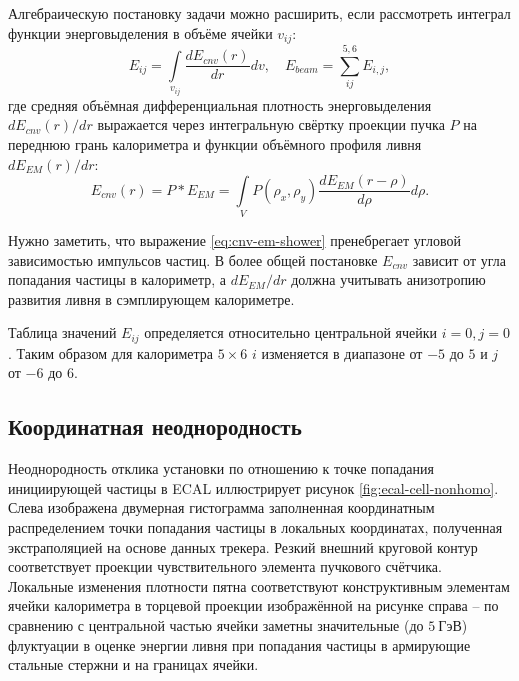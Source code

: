 Алгебраическую постановку задачи можно расширить, если рассмотреть
интеграл функции энерговыделения в объёме ячейки $v_{ij}$:
\begin{equation}
    E_{ij} =\int\limits_{v_{ij}} \frac{dE_{cnv} (r)}{d r} dv, \quad E_{beam} = \sum\limits_{ij}^{5,6} E_{i,j},
\end{equation}
где средняя объёмная дифференциальная плотность
энерговыделения $d E_{cnv}(r)/dr$ выражается через интегральную свёртку
проекции пучка $P$ на переднюю грань калориметра и функции объёмного
профиля ливня~$d E_{EM}(r)/dr$:
\begin{equation}
    E_{cnv}(r) = P * E_{EM}
        = \int\limits_{V} P(\rho_x,\rho_y) \frac{dE_{EM} (r -\rho)}{d \rho} d\rho.
    \label{eq:cnv-em-shower}
\end{equation}

Нужно заметить, что выражение \eqref{eq:cnv-em-shower} пренебрегает угловой
зависимостью импульсов частиц. В более общей постановке $E_{cnv}$
зависит от угла попадания частицы в калориметр, а $d E_{EM}/dr$ должна
учитывать анизотропию развития ливня в сэмплирующем калориметре.

Таблица значений $E_{ij}$ определяется относительно центральной
ячейки $i=0,j=0$. Таким образом для калориметра $5\times6$
$i$ изменяется в диапазоне от $-5$ до $5$ и $j$ от $-6$ до $6$.

\subsection{Координатная неоднородность}

Неоднородность отклика установки по отношению к точке попадания
инициирующей частицы в ECAL
иллюстрирует рисунок \ref{fig:ecal-cell-nonhomo}. Слева
изображена двумерная гистограмма заполненная координатным распределением
точки попадания частицы в локальных координатах, полученная экстраполяцией
на основе данных трекера. Резкий внешний круговой контур
соответствует проекции чувствительного элемента пучкового счётчика.
Локальные изменения плотности пятна соответствуют
конструктивным элементам ячейки калориметра в торцевой проекции изображённой
на рисунке справа -- по сравнению с центральной частью ячейки заметны
значительные (до $5~\text{ГэВ}$) флуктуации в оценке энергии ливня
при попадания частицы в армирующие стальные стержни
и на границах ячейки.


